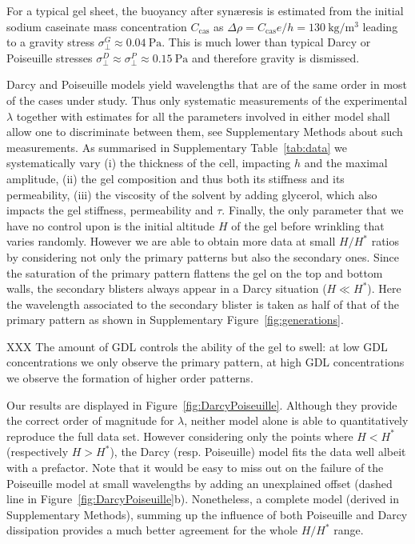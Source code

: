 \documentclass[twocolumn,superscriptaddress,showpacs,preprintnumbers,
amsmath,amssymb,prl]{revtex4-1}
\begin{document}
For a typical gel sheet, the buoyancy after syn\ae{}resis is estimated from the initial sodium caseinate mass concentration $C_\text{cas}$ as $\Delta\rho=C_\text{cas} e/h = \SI{130}{\kilo\gram\per\cubic\metre}$ leading to a gravity stress $\sigma_\perp^G \approx \SI{0.04}{\pascal}$. This is much lower than typical Darcy or Poiseuille stresses $\sigma_\perp^D \approx \sigma_\perp^P \approx \SI{0.15}{\pascal}$ and therefore gravity is dismissed.


Darcy and Poiseuille models yield wavelengths that are of the same order in most of the cases under study. Thus only systematic measurements of the experimental $\lambda$ together with estimates for all the parameters involved in either model shall allow one to discriminate between them, see Supplementary Methods about such measurements. As summarised in Supplementary Table~\ref{tab:data} we systematically vary (i) the thickness of the cell, impacting $h$ and the maximal amplitude, (ii) the gel composition and thus both its stiffness and its permeability, (iii) the viscosity of the solvent by adding glycerol, which also impacts the gel stiffness, permeability and $\tau$. Finally, the only parameter that we have no control upon is the initial altitude $H$ of the gel before wrinkling that varies randomly. However we are able to obtain more data at small $H/H^*$ ratios by considering not only the primary patterns but also the secondary ones. Since the saturation of the primary pattern flattens the gel on the top and bottom walls, the secondary blisters always appear in a Darcy situation ($H\ll H^*$). Here the wavelength associated to the secondary blister is taken as half of that of the primary pattern as shown in Supplementary Figure~\ref{fig:generations}.

XXX The amount of GDL controls the ability of the gel to swell: at low GDL concentrations we only observe the primary pattern, at high GDL concentrations we observe the formation of higher order patterns.

Our results are displayed in Figure~\ref{fig:DarcyPoiseuille}. Although they provide the correct order of magnitude for $\lambda$, neither model alone is able to quantitatively reproduce the full data set. However considering only the points where $H<H^*$ (respectively $H>H^*$), the Darcy (resp. Poiseuille) model fits the data well albeit with a prefactor. Note that it would be easy to miss out on the failure of the Poiseuille model at small wavelengths by adding an unexplained offset (dashed line in Figure~\ref{fig:DarcyPoiseuille}b). Nonetheless, a complete model (derived in Supplementary Methods), summing up the influence of both Poiseuille and Darcy dissipation provides a much better agreement for the whole $H/H^*$ range.
\end{document}
